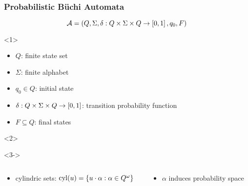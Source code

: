 \documentclass{beamer}
\begin{document}
  \begin{frame}
    \frametitle{Probabilistic Büchi Automata}
    \begin{equation*}
      \mathcal{A} = \left(Q, \Sigma,
      \delta:Q\times\Sigma\times Q\rightarrow\left[0,1\right], q_{0}, F\right)
    \end{equation*}
    \begin{overlayarea}{\textwidth}{0.7\textheight}
      \begin{onlyenv}<1>
        \begin{itemize}
          \item $Q$: finite state set
          \item $\Sigma$: finite alphabet
          \item $q_{0}\in Q$: initial state
          \item $\delta:Q\times\Sigma\times Q\rightarrow \left[0,1\right]$: 
            transition probability function
          \item $F\subseteq Q$: final states
        \end{itemize}
      \end{onlyenv}
      \begin{onlyenv}<2>
        \begin{center}
        \end{center}
      \end{onlyenv}
      \begin{onlyenv}<3->
        \begin{columns}
          \begin{column}{0.5\textwidth}
            \begin{itemize}
              \item<3-> cylindric sets: $\operatorname{cyl}(u) = 
                \left\{u\cdot\alpha:\alpha\in Q^{\omega}\right\}$
            \end{itemize}
            \begin{center}
            \end{center}
          \end{column}
          \begin{column}{0.5\textwidth}
            \begin{itemize}
              \item<4-> $\alpha$ induces probability space 
                \begin{equation*}

\end{equation*}
\end{itemize}
\end{column}
\end{columns}
\end{onlyenv}
\end{overlayarea}
\end{frame}
\end{document}
